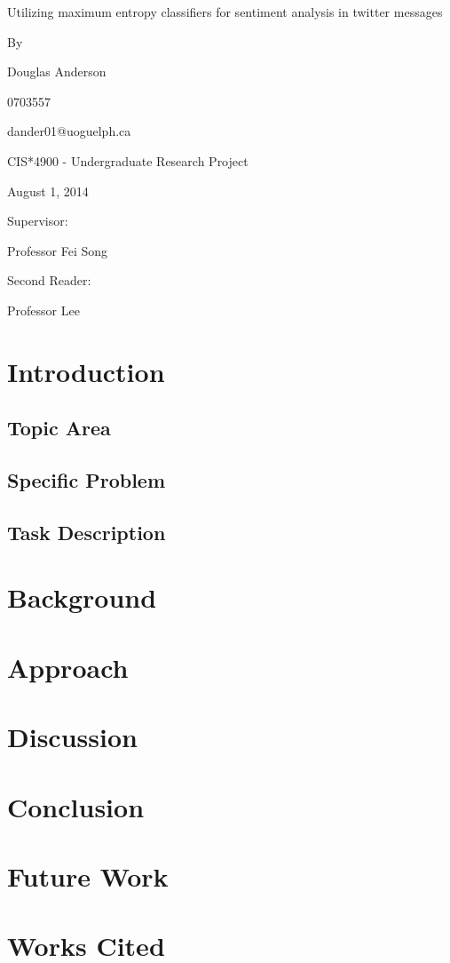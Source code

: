 \documentclass[12pt]{article}
\begin{document}
\thispagestyle{empty}
\begin{center}

\huge

Utilizing maximum entropy classifiers for sentiment analysis in twitter messages

\large
\vspace{2.0cm}
By

\vspace{1.0cm}
Douglas Anderson

0703557

dander01@uoguelph.ca

\vspace{1.5cm}
CIS*4900 - Undergraduate Research Project

August 1, 2014 %

\vspace{1.5cm}

Supervisor:

Professor Fei Song

\vspace{1.5cm}

Second Reader:

Professor Lee %

\end{center}


\newpage
\pagestyle{headings}
\setcounter{page}{1}

\section{Introduction}

\subsection{Topic Area}
\subsection{Specific Problem}
\subsection{Task Description}

\section{Background}

\section{Approach}

\section{Discussion}

\section{Conclusion}

\section{Future Work}

\section{Works Cited}
\end{document}
